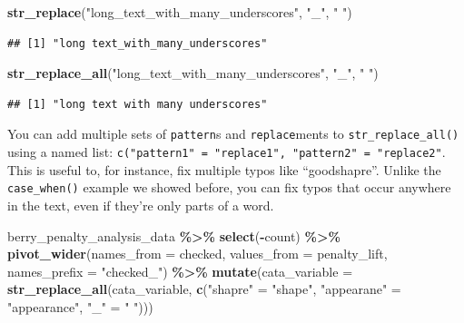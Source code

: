 \documentclass[
]{book}
\newenvironment{Shaded}{\begin{snugshade}}{\end{snugshade}}
\newcommand{\AttributeTok}[1]{\textcolor[rgb]{0.13,0.29,0.53}{#1}}
\newcommand{\FunctionTok}[1]{\textcolor[rgb]{0.13,0.29,0.53}{\textbf{#1}}}
\newcommand{\NormalTok}[1]{#1}
\newcommand{\OtherTok}[1]{\textcolor[rgb]{0.56,0.35,0.01}{#1}}
\newcommand{\SpecialCharTok}[1]{\textcolor[rgb]{0.81,0.36,0.00}{\textbf{#1}}}
\newcommand{\StringTok}[1]{\textcolor[rgb]{0.31,0.60,0.02}{#1}}
\begin{document}
\begin{Shaded}
\begin{Highlighting}[]
\FunctionTok{str\_replace}\NormalTok{(}\StringTok{"long\_text\_with\_many\_underscores"}\NormalTok{, }\StringTok{"\_"}\NormalTok{, }\StringTok{" "}\NormalTok{)}
\end{Highlighting}
\end{Shaded}

\begin{verbatim}
## [1] "long text_with_many_underscores"
\end{verbatim}

\begin{Shaded}
\begin{Highlighting}[]
\FunctionTok{str\_replace\_all}\NormalTok{(}\StringTok{"long\_text\_with\_many\_underscores"}\NormalTok{, }\StringTok{"\_"}\NormalTok{, }\StringTok{" "}\NormalTok{)}
\end{Highlighting}
\end{Shaded}

\begin{verbatim}
## [1] "long text with many underscores"
\end{verbatim}

You can add multiple sets of \texttt{pattern}s and \texttt{replace}ments to \texttt{str\_replace\_all()} using a named list: \texttt{c("pattern1"\ =\ "replace1",\ "pattern2"\ =\ "replace2"}. This is useful to, for instance, fix multiple typos like ``goodshapre''. Unlike the \texttt{case\_when()} example we showed before, you can fix typos that occur anywhere in the text, even if they're only parts of a word.

\begin{Shaded}
\begin{Highlighting}[]
\NormalTok{berry\_penalty\_analysis\_data }\SpecialCharTok{\%\textgreater{}\%}
  \FunctionTok{select}\NormalTok{(}\SpecialCharTok{{-}}\NormalTok{count) }\SpecialCharTok{\%\textgreater{}\%}
  \FunctionTok{pivot\_wider}\NormalTok{(}\AttributeTok{names\_from =}\NormalTok{ checked,}
              \AttributeTok{values\_from =}\NormalTok{ penalty\_lift,}
              \AttributeTok{names\_prefix =} \StringTok{"checked\_"}\NormalTok{) }\SpecialCharTok{\%\textgreater{}\%}
  \FunctionTok{mutate}\NormalTok{(}\AttributeTok{cata\_variable =} \FunctionTok{str\_replace\_all}\NormalTok{(cata\_variable,}
                                         \FunctionTok{c}\NormalTok{(}\StringTok{"shapre"} \OtherTok{=} \StringTok{"shape"}\NormalTok{,}
                                           \StringTok{"appearane"} \OtherTok{=} \StringTok{"appearance"}\NormalTok{,}
                                           \StringTok{"\_"} \OtherTok{=} \StringTok{" "}\NormalTok{)))}
\end{Highlighting}
\end{Shaded}
\end{document}
